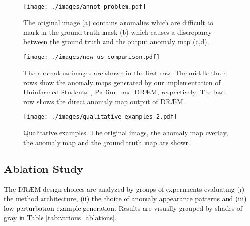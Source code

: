 \documentclass[10pt,twocolumn,letterpaper]{article}
\newcommand\ntxt[1]{\textcolor{black}{#1}}
\begin{document}
\begin{figure}
\centering
  \texttt{[image: ./images/annot\_problem.pdf]}
\caption{The original image (a) contains anomalies which are difficult to mark in the ground truth mask (b) which causes a discrepancy between the ground truth and the output anomaly map (c,d).}
\label{fig:tran_annot}
\end{figure}

\begin{figure}
\centering
  \texttt{[image: ./images/new\_us\_comparison.pdf]}
\caption{The anomalous images are shown in the first row. The middle three rows show the anomaly maps generated by our implementation of Uninformed Students~\cite{bergmann2020uninformed}, PaDim~\cite{defard2020padim} and DR{\AE}M, respectively. The last row shows the direct anomaly map output of DR{\AE}M.}
\label{fig:us_comp}
\end{figure}








\begin{figure*}[!htb]
\centering
  \texttt{[image: ./images/qualitative\_examples\_2.pdf]}
\caption{Qualitative examples. The original image, the anomaly map overlay, the anomaly map and the ground truth map are shown.}
\label{fig:qualitative}
\end{figure*}




\subsection{Ablation Study}

The DR{\AE}M design choices are analyzed by groups of experiments evaluating (i) the method architecture, \ntxt{(ii) the choice of anomaly appearance patterns and (iii) low perturbation example generation.} Results are visually grouped by shades of gray in Table \ref{tab:various_ablations}.
\end{document}
